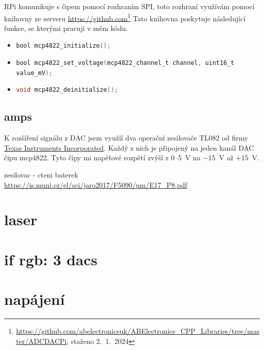 RPi komunikuje s čipem pomocí rozhraním SPI, toto rozhraní využívám pomocí knihovny ze serveru \url{https://github.com}\footnote{\url{https://github.com/abelectronicsuk/ABElectronics_CPP_Libraries/tree/master/ADCDACPi}; staženo 2.~1.~2024} 
Tato knihovna poskytuje následující funkce, se kterými pracuji v mém kódu.
\begin{itemize}
\item
\lstinline[language=C]!bool mcp4822_initialize();!
\item
\lstinline[language=C]!bool mcp4822_set_voltage(mcp4822_channel_t channel, uint16_t value_mV);!
\item
\lstinline[language=C]!void mcp4822_deinitialize();!
\end{itemize}
\subsection{amps}
K rozšíření signálu z DAC jsem využil dva operační zesilovače TL082 od firmy \href{https://www.ti.com/}{Texas Instruments Incorporated}. Každý z nich je připojený na jeden kanál DAC čipu mcp4822.
Tyto čipy mi napěťové rozpětí zvýší z 0--5~V na $-15$~V až $+15$~V.

zesilovac - cteni baterek \url{https://is.muni.cz/el/sci/jaro2017/F5090/um/E17_P8.pdf}

\section{laser}
\section{if rgb: 3 dacs}



\section{napájení}
